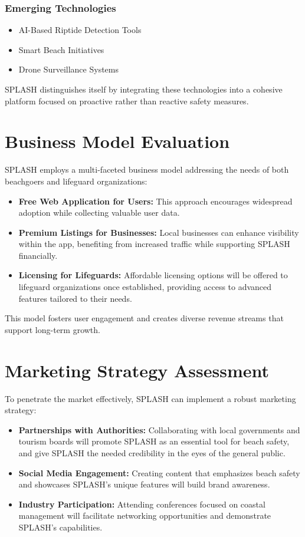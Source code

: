 \subsubsection{Emerging Technologies}
\begin{itemize}
    \item AI-Based Riptide Detection Tools
    \item Smart Beach Initiatives
    \item Drone Surveillance Systems
\end{itemize}

SPLASH distinguishes itself by integrating these technologies into a cohesive platform focused on proactive rather than reactive safety measures.

\section{Business Model Evaluation}
SPLASH employs a multi-faceted business model addressing the needs of both beachgoers and lifeguard organizations:

\begin{itemize}
    \item \textbf{Free Web Application for Users:} This approach encourages widespread adoption while collecting valuable user data.
    \item \textbf{Premium Listings for Businesses:} Local businesses can enhance visibility within the app, benefiting from increased traffic while supporting SPLASH financially.
    \item \textbf{Licensing for Lifeguards:} Affordable licensing options will be offered to lifeguard organizations once established, providing access to advanced features tailored to their needs.
\end{itemize}

This model fosters user engagement and creates diverse revenue streams that support long-term growth.

\section{Marketing Strategy Assessment}
To penetrate the market effectively, SPLASH can implement a robust marketing strategy:

\begin{itemize}
    \item \textbf{Partnerships with Authorities:} Collaborating with local governments and tourism boards will promote SPLASH as an essential tool for beach safety, and give SPLASH the needed credibility in the eyes of the general public.
    \item \textbf{Social Media Engagement:} Creating content that emphasizes beach safety and showcases SPLASH's unique features will build brand awareness.
    \item \textbf{Industry Participation:} Attending conferences focused on coastal management will facilitate networking opportunities and demonstrate SPLASH's capabilities.
\end{itemize}

